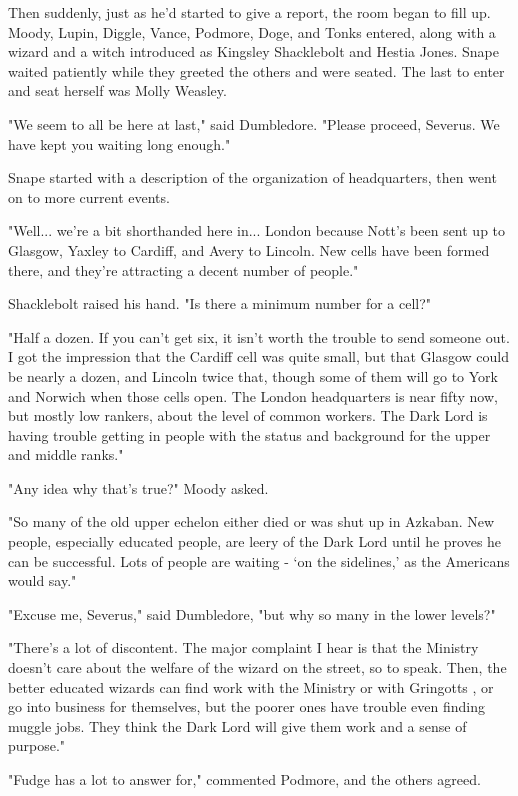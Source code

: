 \documentclass[a4paper,11pt]{article}
\begin{document}
Then suddenly, just as he'd started to give a report, the room began to fill up. Moody, Lupin, Diggle, Vance, Podmore, Doge, and Tonks entered, along with a wizard and a witch introduced as Kingsley Shacklebolt and Hestia Jones. Snape waited patiently while they greeted the others and were seated. The last to enter and seat herself was Molly Weasley.

"We seem to all be here at last," said Dumbledore. "Please proceed, Severus. We have kept you waiting long enough."

Snape started with a description of the organization of headquarters, then went on to more current events.

"Well... we're a bit shorthanded here in... London because Nott's been sent up to Glasgow, Yaxley to Cardiff, and Avery to Lincoln. New cells have been formed there, and they're attracting a decent number of people."

Shacklebolt raised his hand. "Is there a minimum number for a cell?"

"Half a dozen. If you can't get six, it isn't worth the trouble to send someone out. I got the impression that the Cardiff cell was quite small, but that Glasgow could be nearly a dozen, and Lincoln twice that, though some of them will go to York and Norwich when those cells open. The London headquarters is near fifty now, but mostly low rankers, about the level of common workers. The Dark Lord is having trouble getting in people with the status and background for the upper and middle ranks."

"Any idea why that's true?" Moody asked.

"So many of the old upper echelon either died or was shut up in Azkaban. New people, especially educated people, are leery of the Dark Lord until he proves he can be successful. Lots of people are waiting - `on the sidelines,' as the Americans would say."

"Excuse me, Severus," said Dumbledore, "but why so many in the lower levels?"

"There's a lot of discontent. The major complaint I hear is that the Ministry doesn't care about the welfare of the wizard on the street, so to speak. Then, the better educated wizards can find work with the Ministry or with Gringotts , or go into business for themselves, but the poorer ones have trouble even finding muggle jobs. They think the Dark Lord will give them work and a sense of purpose."

"Fudge has a lot to answer for," commented Podmore, and the others agreed.
\end{document}
